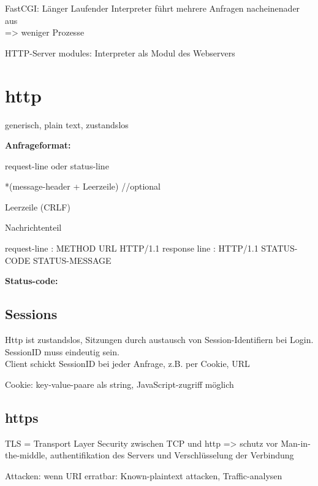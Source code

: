 FastCGI: Länger Laufender Interpreter führt mehrere Anfragen nacheinenader aus \\=> weniger Prozesse

HTTP-Server modules: Interpreter als Modul des Webservers
\section{http}
generisch, plain text, zustandslos

\textbf{Anfrageformat:}

request-line oder status-line

*(message-header + Leerzeile) //optional

Leerzeile (CRLF)

Nachrichtenteil

request-line : METHOD URL HTTP/1.1
response line : HTTP/1.1 STATUS-CODE STATUS-MESSAGE

\textbf{Status-code:}

\subsection{Sessions}
Http ist zustandslos, Sitzungen durch austausch von Session-Identifiern bei Login. \\
SessionID muss eindeutig sein. \\
Client schickt SessionID bei jeder Anfrage, z.B. per Cookie, URL

Cookie: key-value-paare als string, JavaScript-zugriff möglich
\subsection{https}
TLS = Transport Layer Security zwischen TCP und http => schutz vor Man-in-the-middle, authentifikation des Servers und Verschlüsselung der Verbindung

Attacken: wenn URI erratbar: Known-plaintext attacken,  Traffic-analysen
